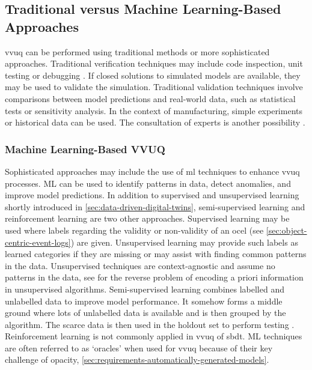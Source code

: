 \subsection{Traditional versus Machine Learning-Based Approaches}
\label{sec:ml-approaches}

\gls{vvuq} can be performed using traditional methods or more sophisticated approaches. Traditional verification techniques may include code inspection, unit testing or debugging \autocite{maniaci2018verification}. If closed solutions to simulated models are available, they may be used to validate the simulation. Traditional validation techniques involve comparisons between model predictions and real-world data, such as statistical tests or sensitivity analysis. In the context of manufacturing, simple experiments or historical data can be used. The consultation of experts is another possibility \autocite{shao2023credibility}.

\subsubsection*{Machine Learning-Based VVUQ}

Sophisticated approaches may include the use of \gls{ml} techniques to enhance \gls{vvuq} processes. ML can be used to identify patterns in data, detect anomalies, and improve model predictions. In addition to supervised and unsupervised learning shortly introduced in \autoref{sec:data-driven-digital-twins}, semi-supervised learning and reinforcement learning are two other approaches. Supervised learning may be used where labels regarding the validity or non-validity of an \gls{ocel} (see \autoref{sec:object-centric-event-logs}) are given. Unsupervised learning may provide such labels as learned categories if they are missing or may assist with finding common patterns in the data. Unsupervised techniques are context-agnostic and assume no patterns in the data, see \textcite{hastie2009unsupervised} for the reverse problem of encoding a priori information in unsupervised algorithms. Semi-supervised learning combines labelled and unlabelled data to improve model performance. It somehow forms a middle ground where lots of unlabelled data is available and is then grouped by the algorithm. The scarce data is then used in the holdout set to perform testing \autocite{learning2006semi}. Reinforcement learning is not commonly applied in \gls{vvuq} of \gls{sbdt}.
ML techniques are often referred to as `oracles' when used for \gls{vvuq} because of their key challenge of opacity, \autoref{sec:requirements-automatically-generated-models}.

